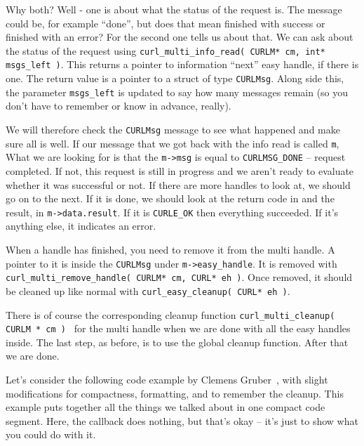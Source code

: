 Why both? Well - one is about what the status of the request is. The message could be, for example ``done'', but does that mean finished with success or finished with an error? For the second one tells us about that. We can ask about the status of the request using \texttt{curl\_multi\_info\_read( CURLM* cm, int* msgs\_left )}. This returns a pointer to information ``next'' easy handle, if there is one. The return value is a pointer to a struct of type \texttt{CURLMsg}. Along side this, the parameter \texttt{msgs\_left} is updated to say how many messages remain (so you don't have to remember or know in advance, really).

We will therefore check the \texttt{CURLMsg} message to see what happened and make sure all is well. If our message that we got back with the info read is called \texttt{m}, What we are looking for is that the \texttt{m->msg} is equal to \texttt{CURLMSG\_DONE} -- request completed. If not, this request is still in progress and we aren't ready to evaluate whether it was successful or not. If there are more handles to look at, we should go on to the next. If it is done, we should look at the return code in and the result, in \texttt{m->data.result}. If it is \texttt{CURLE\_OK} then everything succeeded. If it's anything else, it indicates an error.

When a handle has finished, you need to remove it from the multi handle. A pointer to it is inside the \texttt{CURLMsg} under \texttt{m->easy\_handle}. It is removed with \texttt{curl\_multi\_remove\_handle( CURLM* cm, CURL* eh )}. Once removed, it should be cleaned up like normal with \texttt{curl\_easy\_cleanup( CURL* eh )}.

There is of course the corresponding cleanup function \texttt{curl\_multi\_cleanup( CURLM * cm ) } for the multi handle when we are done with all the easy handles inside. The last step, as before, is to use the global cleanup function. After that we are done.

Let's consider the following code example by Clemens Gruber~\cite{curlmulti}, with slight modifications for compactness, formatting, and to remember the cleanup. This example puts together all the things we talked about in one compact code segment. Here, the callback does nothing, but that's okay -- it's just to show what you could do with it.

